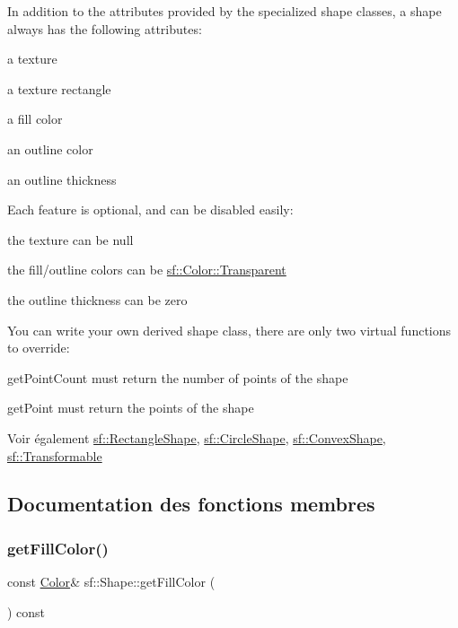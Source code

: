 In addition to the attributes provided by the specialized shape classes, a shape always has the following attributes\+: \begin{DoxyItemize}
\item a texture \item a texture rectangle \item a fill color \item an outline color \item an outline thickness\end{DoxyItemize}
Each feature is optional, and can be disabled easily\+: \begin{DoxyItemize}
\item the texture can be null \item the fill/outline colors can be \hyperlink{classsf_1_1Color_a569b45471737f770656f50ae7bbac292}{sf\+::\+Color\+::\+Transparent} \item the outline thickness can be zero\end{DoxyItemize}
You can write your own derived shape class, there are only two virtual functions to override\+: \begin{DoxyItemize}
\item get\+Point\+Count must return the number of points of the shape \item get\+Point must return the points of the shape\end{DoxyItemize}
\begin{DoxySeeAlso}{Voir également}
\hyperlink{classsf_1_1RectangleShape}{sf\+::\+Rectangle\+Shape}, \hyperlink{classsf_1_1CircleShape}{sf\+::\+Circle\+Shape}, \hyperlink{classsf_1_1ConvexShape}{sf\+::\+Convex\+Shape}, \hyperlink{classsf_1_1Transformable}{sf\+::\+Transformable} 
\end{DoxySeeAlso}


\subsection{Documentation des fonctions membres}
\mbox{\label{classsf_1_1Shape_ae3030128824e687f259d18addcf33528}} 
\subsubsection{\texorpdfstring{get\+Fill\+Color()}{getFillColor()}}
{\footnotesize\ttfamily const \hyperlink{classsf_1_1Color}{Color}\& sf\+::\+Shape\+::get\+Fill\+Color (\begin{DoxyParamCaption}{ }\end{DoxyParamCaption}) const}



